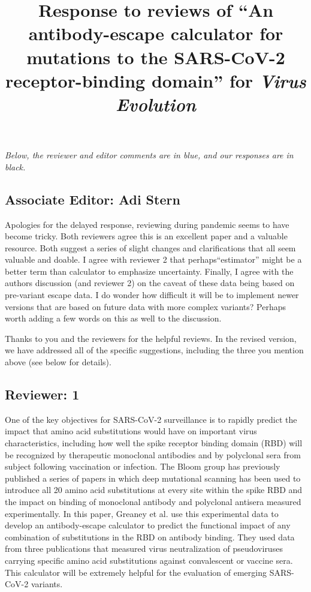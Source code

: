 \documentclass[11pt, oneside]{article}   	%
\title{Response to reviews of ``An antibody-escape calculator for mutations to the SARS-CoV-2 receptor-binding domain'' for \textit{Virus Evolution}}
\author{}
\newcommand{\response}[1]{{\color{black}#1}}
\begin{document}
\maketitle

\emph{Below, the reviewer and editor comments {\color{blue} are in blue}, and our responses are in black.}

\color{blue}

\subsection*{Associate Editor: Adi Stern}

Apologies for the delayed response, reviewing during pandemic seems to have become tricky.
Both reviewers agree this is an excellent paper and a valuable resource.
Both suggest a series of slight changes and clarifications that all seem valuable and doable.
I agree with reviewer 2 that perhaps``estimator'' might be a better term than calculator to emphasize uncertainty. 
Finally, I agree with the authors discussion (and reviewer 2) on the caveat of these data being based on pre-variant escape data.
I do wonder how difficult it will be to implement newer versions that are based on future data with more complex variants?
Perhaps worth adding a few words on this as well to the discussion.

\response{Thanks to you and the reviewers for the helpful reviews. In the revised version, we have addressed all of the specific suggestions, including the three you mention above (see below for details).}

\subsection*{Reviewer: 1}

One of the key objectives for SARS-CoV-2 surveillance is to rapidly predict the impact that amino acid substitutions would have on important virus characteristics, including how well the spike receptor binding domain (RBD) will be recognized by therapeutic monoclonal antibodies and by polyclonal sera from subject following vaccination or infection.  The Bloom group has previously published a series of papers in which deep mutational scanning has been used to introduce all 20 amino acid substitutions at every site within the spike RBD and the impact on binding of monoclonal antibody and polyclonal antisera measured experimentally.  In this paper, Greaney et al. use this experimental data to develop an antibody-escape calculator to predict the functional impact of any combination of substitutions in the RBD on antibody binding.  They used data from three publications that measured virus neutralization of pseudoviruses carrying specific amino acid substitutions against convalescent or vaccine sera.  This calculator will be extremely helpful for the evaluation of emerging SARS-CoV-2 variants.  
\end{document}
